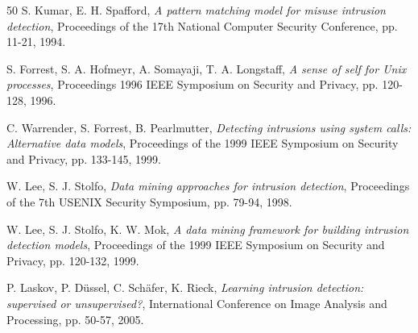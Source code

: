 \begin{thebibliography}{50}
S. Kumar, E. H. Spafford, 
\textit{A pattern matching model for misuse intrusion detection}, 
Proceedings of the 17th National Computer Security Conference, pp. 11-21, 1994.

S. Forrest, S. A. Hofmeyr, A. Somayaji, T. A. Longstaff, 
\textit{A sense of self for Unix processes}, 
Proceedings 1996 IEEE Symposium on Security and Privacy, pp. 120-128, 1996.

C. Warrender, S. Forrest, B. Pearlmutter, 
\textit{Detecting intrusions using system calls: Alternative data models}, 
Proceedings of the 1999 IEEE Symposium on Security and Privacy, pp. 133-145, 1999.

W. Lee, S. J. Stolfo, 
\textit{Data mining approaches for intrusion detection}, 
Proceedings of the 7th USENIX Security Symposium, pp. 79-94, 1998.

W. Lee, S. J. Stolfo, K. W. Mok, 
\textit{A data mining framework for building intrusion detection models}, 
Proceedings of the 1999 IEEE Symposium on Security and Privacy, pp. 120-132, 1999.

P. Laskov, P. Düssel, C. Schäfer, K. Rieck, 
\textit{Learning intrusion detection: supervised or unsupervised?}, 
International Conference on Image Analysis and Processing, pp. 50-57, 2005.

\end{thebibliography}
